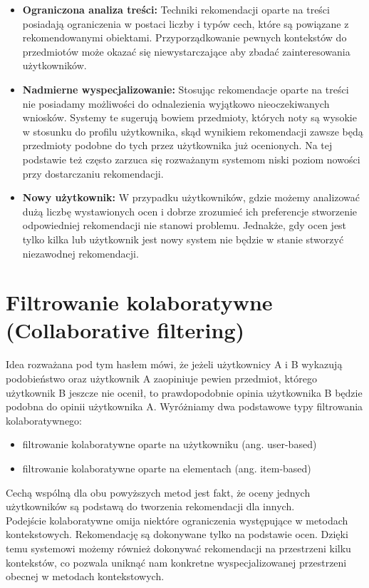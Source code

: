 \documentclass[12pt,a4paper]{report}
\begin{document}
{\begin{itemize}
\item \textbf{Ograniczona analiza treści:} Techniki rekomendacji oparte na treści posiadają ograniczenia w postaci liczby i typów cech, które są powiązane z rekomendowanymi obiektami. Przyporządkowanie pewnych kontekstów do przedmiotów może okazać się niewystarczające aby zbadać zainteresowania użytkowników.
\item \textbf{Nadmierne wyspecjalizowanie:} Stosując rekomendacje oparte na treści nie posiadamy możliwości do odnalezienia wyjątkowo nieoczekiwanych wniosków. Systemy te sugerują bowiem przedmioty, których noty są wysokie w stosunku do profilu użytkownika, skąd wynikiem rekomendacji zawsze będą przedmioty podobne do tych przez użytkownika już ocenionych. Na tej podstawie też często zarzuca się rozważanym systemom niski poziom nowości przy dostarczaniu rekomendacji.
 \item \textbf{Nowy użytkownik:} W przypadku użytkowników, gdzie możemy analizować dużą liczbę wystawionych ocen i dobrze zrozumieć ich preferencje stworzenie odpowiedniej rekomendacji nie stanowi problemu. Jednakże, gdy ocen jest tylko kilka lub użytkownik jest nowy system nie będzie w stanie stworzyć niezawodnej rekomendacji.
\end{itemize} 

\section{Filtrowanie kolaboratywne (Collaborative filtering)}

Idea rozważana pod tym hasłem mówi, że jeżeli użytkownicy A i B wykazują podobieństwo oraz użytkownik A zaopiniuje pewien przedmiot, którego użytkownik B jeszcze nie ocenił, to prawdopodobnie opinia użytkownika B będzie podobna do opinii użytkownika A. Wyróżniamy dwa podstawowe typy filtrowania kolaboratywnego:
\begin{itemize}
\item filtrowanie kolaboratywne oparte na użytkowniku (ang. user-based)
\item filtrowanie kolaboratywne oparte na  elementach (ang. item-based)
\end{itemize}
Cechą wspólną dla obu powyższych metod jest fakt, że oceny jednych użytkowników są podstawą do tworzenia rekomendacji dla innych. 
\\Podejście kolaboratywne omija niektóre ograniczenia występujące w metodach kontekstowych. Rekomendację są dokonywane tylko na podstawie ocen. Dzięki temu systemowi możemy również dokonywać rekomendacji na przestrzeni kilku kontekstów, co pozwala uniknąć nam konkretne wyspecjalizowanej przestrzeni obecnej w metodach kontekstowych.
}
\end{document}
